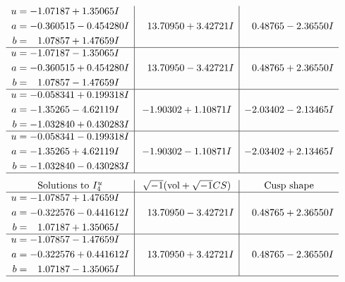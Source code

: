 \documentclass[1p]{elsarticle_modified}
\theoremstyle{definition}
\newcommand{\I}{\sqrt{-1}}
\begin{document}
$$\begin{array}{c|c|c}
\begin{aligned}
u &= -1.07187 + 1.35065 I \\
a &= -0.360515 - 0.454280 I \\
b &= \phantom{-}1.07857 + 1.47659 I\end{aligned}
 & \phantom{-}13.70950 + 3.42721 I & \phantom{-}0.48765 - 2.36550 I \\ \hline\begin{aligned}
u &= -1.07187 - 1.35065 I \\
a &= -0.360515 + 0.454280 I \\
b &= \phantom{-}1.07857 - 1.47659 I\end{aligned}
 & \phantom{-}13.70950 - 3.42721 I & \phantom{-}0.48765 + 2.36550 I \\ \hline\begin{aligned}
u &= -0.058341 + 0.199318 I \\
a &= -1.35265 - 4.62119 I \\
b &= -1.032840 + 0.430283 I\end{aligned}
 & -1.90302 + 1.10871 I & -2.03402 - 2.13465 I \\ \hline\begin{aligned}
u &= -0.058341 - 0.199318 I \\
a &= -1.35265 + 4.62119 I \\
b &= -1.032840 - 0.430283 I\end{aligned}
 & -1.90302 - 1.10871 I & -2.03402 + 2.13465 I\\
 \hline 
 \end{array}$$\newpage$$\begin{array}{c|c|c}  
\text{Solutions to }I^u_{4}& \I (\text{vol} + \sqrt{-1}CS) & \text{Cusp shape}\\
 \hline 
\begin{aligned}
u &= -1.07857 + 1.47659 I \\
a &= -0.322576 - 0.441612 I \\
b &= \phantom{-}1.07187 + 1.35065 I\end{aligned}
 & \phantom{-}13.70950 - 3.42721 I & \phantom{-}0.48765 + 2.36550 I \\ \hline\begin{aligned}
u &= -1.07857 - 1.47659 I \\
a &= -0.322576 + 0.441612 I \\
b &= \phantom{-}1.07187 - 1.35065 I\end{aligned}
 & \phantom{-}13.70950 + 3.42721 I & \phantom{-}0.48765 - 2.36550 I\\
 \hline 
 \end{array}$$\newpage
\end{document}
